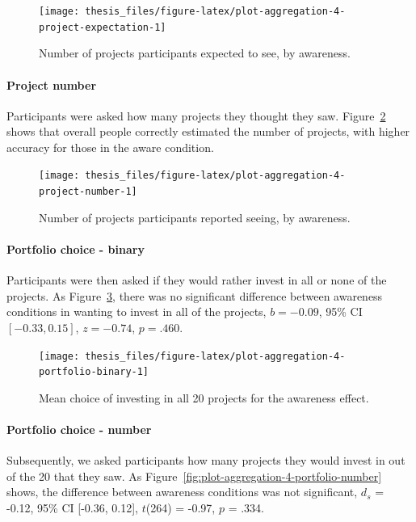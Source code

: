 \documentclass[a4paper, nobind, dvipsnames]{templates/ociamthesis}
\theoremstyle{definition}
\theoremstyle{definition}
\theoremstyle{definition}
\theoremstyle{definition}
\theoremstyle{remark}
\begin{document}
\begin{figure}
\texttt{[image: thesis\_files/figure-latex/plot-aggregation-4-project-expectation-1]} \caption{Number of projects participants expected to see, by awareness.}\label{fig:plot-aggregation-4-project-expectation}
\end{figure}

\paragraph{Project number}

Participants were asked how many projects they thought they saw.
Figure~\ref{fig:plot-aggregation-4-project-number} shows that overall people
correctly estimated the number of projects, with higher accuracy for those in the
aware condition.



\begin{figure}
\texttt{[image: thesis\_files/figure-latex/plot-aggregation-4-project-number-1]} \caption{Number of projects participants reported seeing, by awareness.}\label{fig:plot-aggregation-4-project-number}
\end{figure}

\paragraph{Portfolio choice - binary}

Participants were then asked if they would rather invest in all or none of the
projects. As Figure~\ref{fig:plot-aggregation-4-portfolio-binary}, there was no
significant difference between awareness conditions in wanting to invest
in all of the projects,
\(b = -0.09\), 95\% CI \([-0.33, 0.15]\), \(z = -0.74\), \(p = .460\).



\begin{figure}
\texttt{[image: thesis\_files/figure-latex/plot-aggregation-4-portfolio-binary-1]} \caption{Mean choice of investing in all 20 projects for the awareness effect.}\label{fig:plot-aggregation-4-portfolio-binary}
\end{figure}

\paragraph{Portfolio choice - number}

Subsequently, we asked participants how many projects they would invest in out
of the 20 that they saw. As
Figure~\ref{fig:plot-aggregation-4-portfolio-number} shows, the difference
between awareness conditions was not significant,
\(d_s\) = -0.12, 95\% CI {[}-0.36, 0.12{]}, \(t\)(264) = -0.97, \(p\) = .334.
\end{document}
